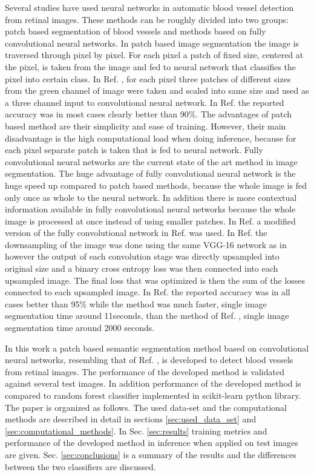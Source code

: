 \documentclass[aps,prb,10pt,twocolumn,groupedaddress]{revtex4-1}
\begin{document}
Several studies have used neural networks in automatic blood vessel detection from retinal images. These methods can be roughly divided into two groups: patch based segmentation of blood vessels\cite{tan} and methods based on fully convolutional neural networks\cite{long,hu}. In patch based image segmentation the image is traversed through pixel by pixel. For each pixel a patch of fixed size, centered at the pixel, is taken from the image and fed to neural network that classifies the pixel into certain class. In Ref. \cite{tan}, for each pixel three patches of different sizes from the green channel of image were taken and scaled into same size and used as a three channel input to convolutional neural network. In Ref. \cite{tan} the reported accuracy was in most cases clearly better than 90\%. 
The advantages of patch based method are their simplicity and ease of training. However, their main disadvantage is the high computational load when doing inference, because for each pixel separate patch is taken that is fed to neural network. Fully convolutional neural networks\cite{long} are the current state of the art method in image segmentation. The huge advantage of fully convolutional neural network is the huge speed up compared to patch based methods, because the whole image is fed only once as whole to the neural network. In addition there is more contextual information available in fully convolutional neural networks because the whole image is processed at once instead of using smaller patches. In Ref. \cite{hu} a modified version of the fully convolutional network in Ref. \cite{long} was used. In Ref. \cite{hu} the downsampling of the image was done using the same VGG-16 network as in \cite{long} however the output of each convolution stage was directly upsampled into original size and a binary cross entropy loss was then connected into each upsampled image. The final loss that was optimized is then the sum of the losses connected to each upsampled image. In Ref. \cite{hu} the reported accuracy was in all cases better than 95\% while the method was much faster, single image segmentation time around 11seconds, than the method of Ref. \cite{tan}, single image segmentation time around 2000 seconds.  

In this work a patch based semantic segmentation method based on convolutional neural networks, resembling that of Ref. \cite{tan},  is developed to detect blood vessels from retinal images. The performance of the developed method is validated against several test images. In addition performance of the developed method is compared to random forest classifier implemented in scikit-learn python library.
The paper is organized as follows. The used data-set and the computational
methods are described in detail in sections \ref{sec:used_data_set} and \ref{sec:computational_methods}. In Sec. \ref{sec:results} training metrics and performance of the developed method in inference when applied on test images are given.
Sec. \ref{sec:conclusions} is a summary of the results and the differences between the two classifiers are discussed.
\end{document}
